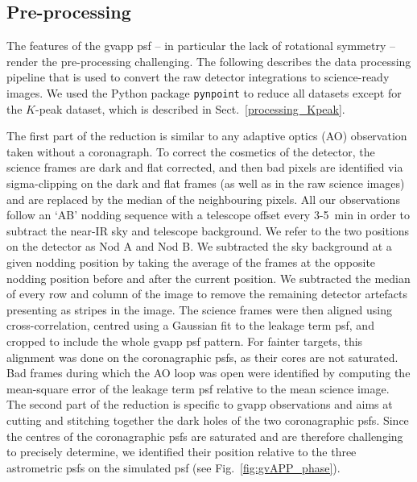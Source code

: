 \documentclass{aa}
\begin{document}
\subsection{Pre-processing}

\label{sect:preprocessing}

The features of the \ac{gvapp} \ac{psf} -- in particular the lack of rotational symmetry -- render the pre-processing challenging.
%
The following describes the data processing pipeline that is used to convert the raw detector integrations to science-ready images. 
%
We used the Python package \texttt{pynpoint} \citep{Amara2012PYNPOINTexoplanets,Stolker2019PynPointdata} to reduce all datasets except for the $K$-peak dataset, which is described in Sect.~\ref{processing_Kpeak}.

The first part of the reduction is similar to any adaptive optics (AO) observation taken without a coronagraph.
%
To correct the cosmetics of the detector, the science frames are dark and flat corrected, and then bad pixels are identified via sigma-clipping on the dark and flat frames (as well as in the raw science images) and are replaced by the median of the neighbouring pixels.
%
All our observations follow an `AB' nodding sequence with a telescope offset every 3-5~min in order to subtract the near-IR sky and telescope background.
%
We refer to the two positions on the detector as Nod A and Nod B.
%
We subtracted the sky background at a given nodding position by taking the average of the frames at the opposite nodding position before and after the current position.
%
We subtracted the median of every row and column of the image to remove the remaining detector artefacts presenting as stripes in the image.
%
The science frames were then aligned using cross-correlation, centred using a Gaussian fit to the leakage term \ac{psf}, and cropped to include the whole \ac{gvapp} \ac{psf} pattern.
%
For fainter targets, this alignment was done on the coronagraphic \acp{psf}, as their cores are not saturated.
%
Bad frames during which the AO loop was open were identified by computing the mean-square error of the leakage term \ac{psf} relative to the mean science image.
%
The second part of the reduction is specific to \ac{gvapp} observations and aims at cutting and stitching together the dark holes of the two coronagraphic \acp{psf}.
%
Since the centres of the coronagraphic \acp{psf} are saturated and are therefore challenging to precisely determine, we identified their position relative to the three astrometric \acp{psf} on the simulated \ac{psf} (see Fig.~\ref{fig:gvAPP_phase}).
\end{document}
